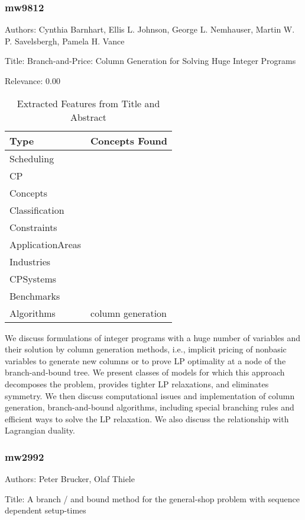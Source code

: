 \subsubsection{mw9812}
\label{mw:mw9812}

Authors: Cynthia Barnhart, Ellis L. Johnson, George L. Nemhauser, Martin W. P. Savelsbergh, Pamela H. Vance

Title: Branch-and-Price: Column Generation for Solving Huge Integer Programs

Relevance:  0.00

{\scriptsize
\begin{longtable}{p{2cm}p{20cm}}
\caption{Extracted Features from Title and Abstract}\\ \toprule
Type & Concepts Found\\ \midrule
\endhead
\bottomrule
\endfoot
Scheduling & \\ 
CP & \\ 
Concepts & \\ 
Classification & \\ 
Constraints & \\ 
ApplicationAreas & \\ 
Industries & \\ 
CPSystems & \\ 
Benchmarks & \\ 
Algorithms & column generation\\ 
\end{longtable}
}

  We discuss formulations of integer programs with a huge number of variables and their solution by column generation methods, i.e., implicit pricing of nonbasic variables to generate new columns or to prove LP optimality at a node of the branch-and-bound tree. We present classes of models for which this approach decomposes the problem, provides tighter LP relaxations, and eliminates symmetry. We then discuss computational issues and implementation of column generation, branch-and-bound algorithms, including special branching rules and efficient ways to solve the LP relaxation. We also discuss the relationship with Lagrangian duality.  

\subsubsection{mw2992}
\label{mw:mw2992}

Authors: Peter Brucker, Olaf Thiele

Title: A branch / and  bound method for the general-shop problem with sequence dependent setup-times

